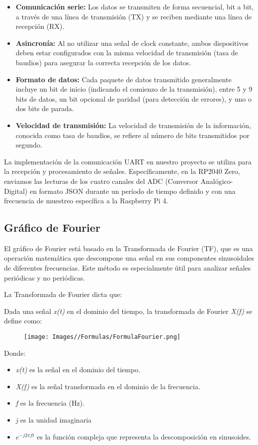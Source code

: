 \documentclass{article}
\begin{document}
\begin{itemize}
    \item \textbf{Comunicación serie:} Los datos se transmiten de forma secuencial, bit a bit, a través de una línea de transmisión (TX) y se reciben mediante una línea de recepción (RX).
    \item \textbf{Asincronía:} Al no utilizar una señal de clock constante, ambos dispositivos deben estar configurados con la misma velocidad de transmisión (tasa de baudios) para asegurar la correcta recepción de los datos.
    \item \textbf{Formato de datos:} Cada paquete de datos transmitido generalmente incluye un bit de inicio (indicando el comienzo de la transmisión), entre 5 y 9 bits de datos, un bit opcional de paridad (para detección de errores), y uno o dos bits de parada.
    \item \textbf{Velocidad de transmisión:} La velocidad de transmisión de la información, conocida como tasa de baudios, se refiere al número de bits transmitidos por segundo.
\end{itemize}

La implementación de la comunicación UART en nuestro proyecto se utiliza para la recepción y procesamiento de señales. Específicamente, en la RP2040 Zero, enviamos las lecturas de los cuatro canales del ADC (Conversor Analógico-Digital) en formato JSON durante un período de tiempo definido y con una frecuencia de muestreo específica a la Raspberry Pi 4.

\subsection{Gráfico de Fourier}
El gráfico de Fourier está basado en la Transformada de Fourier (TF), que es una operación matemática que descompone una señal en sus componentes sinusoidales de diferentes frecuencias. Este método es especialmente útil para analizar señales periódicas y no periódicas.

La Transformada de Fourier dicta que: 

Dada una señal \textit{x(t)} en el dominio del tiempo, la transformada de Fourier \textit{X(f)} se define como:

\begin{figure}[H]
    \centering
    \texttt{[image: Images//Formulas/FormulaFourier.png]}
\end{figure}

Donde:
\begin{itemize}
    \item \textit{x(t)} es la señal en el dominio del tiempo.
    \item \textit{X(f)} es la señal transformada en el dominio de la frecuencia.
    \item \textit{f} es la frecuencia (Hz).
    \item \textit{j} es la unidad imaginaria 
    \item $e^{-j2\pi ft}$ es la función compleja que representa la descomposición en sinusoides.

\end{itemize}
\end{document}
